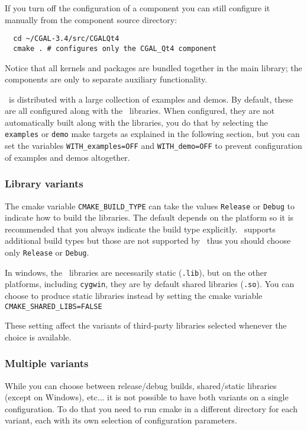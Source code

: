 If you turn off the configuration of a component you can still configure it manually from the component source directory:

{\ccTexHtml{\scriptsize}{}
\begin{verbatim}
  cd ~/CGAL-3.4/src/CGALQt4 
  cmake . # configures only the CGAL_Qt4 component
\end{verbatim}
}

Notice that all kernels and packages are bundled together in the main library; the components are only to separate
auxiliary functionality.

\cgal\ is distributed with a large collection of examples and demos. By default, these are all configured along with
the \cgal\ libraries. When configured, they are not automatically built along with the libraries, you do that
by selecting the \texttt{examples} or \texttt{demo} make targets as explained in the following section, but you can set the 
variables {\tt WITH\_examples=OFF} and {\tt WITH\_demo=OFF} to prevent configuration of examples and demos altogether.

\subsubsection{Library variants}

The cmake variable \texttt{CMAKE\_BUILD\_TYPE} can take the values \texttt{Release} or \texttt{Debug} to indicate how to build
the libraries. The default depends on the platform so it is recommended that you always indicate the build type explicitly.
\cmake\ supports additional build types but those are not supported by \cgal\, thus you should choose only
\texttt{Release} or \texttt{Debug}.

In windows, the \cgal\ libraries are necessarily static
({\tt .lib}), but on the other platforms, including \texttt{cygwin}, they are by default shared libraries ({\tt .so}).
You can choose to produce static libraries instead by setting the cmake variable {\tt CMAKE\_SHARED\_LIBS=FALSE} 

These setting affect the variants of third-party libraries selected whenever the choice is available.

\subsubsection{Multiple variants}\label{sec:cmake-out-of-source}

While you can choose between release/debug builds, shared/static libraries
(except on Windows), etc...
it is not possible to have both variants on a single configuration. To do that you need to run cmake in a 
different directory for each variant, each with its own selection of configuration parameters.

